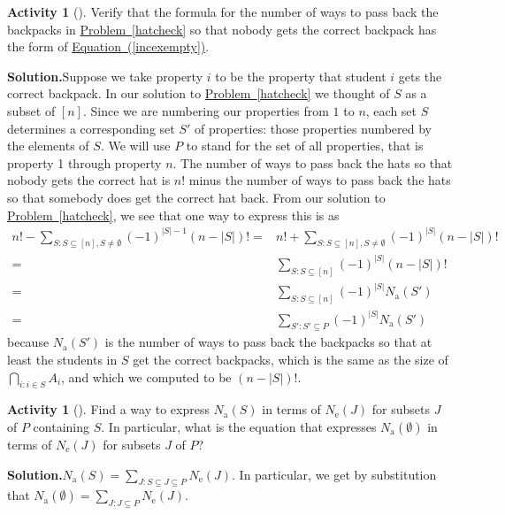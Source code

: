 \documentclass[10pt,]{book}
\theoremstyle{plain}
\theoremstyle{definition}
\newtheorem{activity}[project]{Activity}
\numberwithin{equation}{chapter}
\newcommand{\amp}{&}
\begin{document}
\begin{activity}[]\label{activity-214}
Verify that the formula for the number of ways to pass back the backpacks in \hyperref[hatcheck]{Problem~\ref{hatcheck}} so that nobody gets the correct backpack has the form of \hyperref[incexempty]{Equation~(\ref{incexempty})}.%
\par\medskip\noindent%
\textbf{Solution.}\quad Suppose we take property \(i\) to be the property that student \(i\) gets the correct backpack. In our solution to \hyperref[hatcheck]{Problem~\ref{hatcheck}} we thought of \(S\) as a subset of \([n]\). Since we are numbering our properties from \(1\) to \(n\), each set \(S\) determines a corresponding set \(S'\) of properties: those properties numbered by the elements of \(S\). We will use \(P\) to stand for the set of all properties, that is property 1 through property \(n\). The number of ways to pass back the hats so that nobody gets the correct hat is \(n!\) minus the number of ways to pass back the hats so that somebody does get the correct hat back. From our solution to \hyperref[hatcheck]{Problem~\ref{hatcheck}}, we see that one way to express this is as%
\begin{align*}
n!-\sum_{S:
S\subseteq [n], S\not=\emptyset}(-1)^{|S|-1} (n-|S|)! =\amp
n!+\sum_{S:
S\subseteq [n], S\not=\emptyset}(-1)^{|S|} (n-|S|)!\\
=\amp
\sum_{S:
S\subseteq [n]}(-1)^{|S|} (n-|S|)!\\
=\amp \sum_{S:
S\subseteq [n]}(-1)^{|S|} N_{\mbox{a} }(S')\\
=\amp
\sum_{S':
S'\subseteq P}(-1)^{|S|} N_{\mbox{a} }(S')
\end{align*}
because \(N_{\mbox{a} }(S')\) is the number of ways to pass back the backpacks so that at least the students in \(S\) get the correct backpacks, which is the same as the size of \(\bigcap_{i:i\in S} A_i\), and which we computed to be \((n-|S|)!\).%
\end{activity}
\begin{activity}[]\label{incexsystemeq}
Find a way to express \(N_{\mbox{a} }(S)\) in terms of \(N_{\mbox{e} }(J)\) for subsets \(J\) of \(P\) containing \(S\). In particular, what is the equation that expresses \(N_{\mbox{a} }(\emptyset)\) in terms of \(N_{\mbox{e} }(J)\) for subsets \(J\) of \(P\)?%
\par\medskip\noindent%
\textbf{Solution.}\quad \(N_{\mbox{a} }(S) = \sum_{J: S\subseteq
J\subseteq P}N_{\mbox{e} }(J)\). In particular, we get by substitution that \(N_{\mbox{a} }(\emptyset)=\sum_{J:J\subseteq P} N_{\mbox{e} }(J)\).%
\end{activity}
\end{document}
